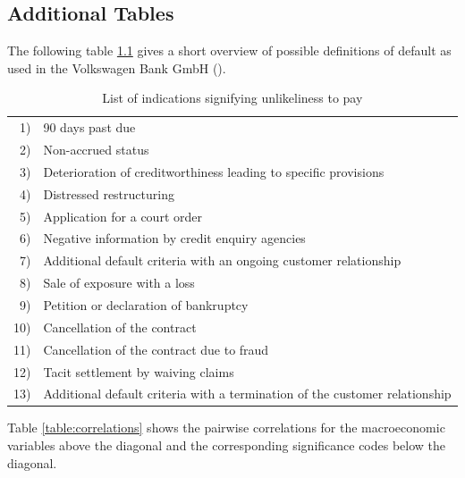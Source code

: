 \documentclass[a4paper, 12pt]{scrreprt}
\begin{document}
\begin{appendices}
	
\chapter{Additional Tables}

The following table \ref{defaultindications} gives a short overview of possible definitions of default as used in the Volkswagen Bank GmbH (\textcite[p. 52]{ivanchenko2017predicting}).
\begin{table}[H]
 \centering
		\begin{tabular}{rl}
			1)  & 90 days past due  \\
			2)  & Non-accrued status \\
			3)  & Deterioration of creditworthiness leading to specific provisions \\
			4)  & Distressed restructuring \\
			5)  & Application for a court order \\
			6)  & Negative information by credit enquiry agencies \\
			7)  & Additional default criteria with an ongoing customer relationship  \\
			8)  & Sale of exposure with a loss \\
			9)  & Petition or declaration of bankruptcy \\
			10) & Cancellation of the contract \\
			11) & Cancellation of the contract due to fraud \\
			12) & Tacit settlement by waiving claims \\
			13) & Additional default criteria with a termination of the customer relationship
		\end{tabular}
		\caption{List of indications signifying unlikeliness to pay}
		\label{defaultindications}
\end{table}

\medskip
Table \ref{table:correlations} shows the pairwise correlations for the macroeconomic variables above the diagonal and the corresponding significance codes below the diagonal. 


\end{appendices}
\end{document}
